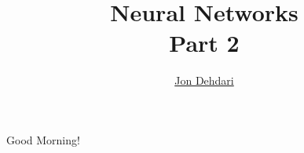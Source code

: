 \documentclass[xcolor=pdftex,x11names,table,hyperref]{beamer}
\begin{document}
\title{Neural Networks \\[1.5em]
 \small{Part 2} \\[1.0em]
 }
\author{\href{http://jon.dehdari.org}{Jon Dehdari}}
\frame{\titlepage}

\begin{frame}{Good Morning!}
	\begin{center}
	\end{center}
\end{frame}


\end{document}
